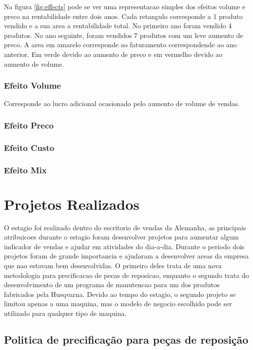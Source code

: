 \documentclass[12pt]{article}
\begin{document}
Na figura \ref{fig:effects} pode se ver uma representacao simples dos efeitos volume e preco na rentabilidade entre dois anos. Cada retangulo corresponde a 1 produto vendido e a sua area a rentabilidade total. No primeiro ano foram vendido 4 produtos. No ano seguinte, foram vendidos 7 produtos com um leve aumento de preco. A area em amarelo corresponde ao faturamento correspondende ao ano anterior. Em verde devido ao aumento de preco e em vermelho devido ao aumento de volume.

\subsubsection{Efeito Volume}
Corresponde ao lucro adicional ocasionado pelo aumento de volume de vendas.

\subsubsection{Efeito Preco}
\subsubsection{Efeito Custo}
\subsubsection{Efeito Mix}

\section{Projetos Realizados}

	O estagio foi realizado dentro do escritorio de vendas da Alemanha, as principais atribuicoes durante o estagio foram desenvolver projetos para aumentar algum indicador de vendas e ajudar em atividades do dia-a-dia.  Durante o periodo dois projetos foram de grande importancia e ajudaram a desenvolver areas da empresa que nao estavam bem desenvolvidas. O primeiro deles trata de uma nova metodologia para precificacao de pecas de reposicao, enquanto o segundo trata do desenvolvimento de um programa de manutencao para um dos produtos fabricados pela Husqvarna. Devido ao tempo do estagio, o segundo projeto se limitou apenas a uma maquina, mas o modelo de negocio escolhido pode ser utilizado para qualquer tipo de maquina.

\subsection{Politica de precificação para peças de reposição}
\end{document}
